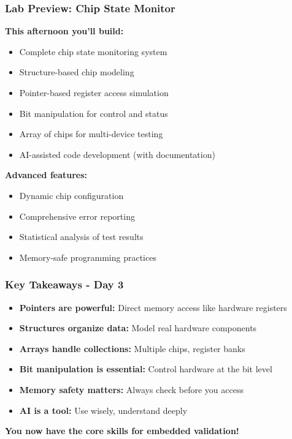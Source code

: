 \documentclass{beamer}
\begin{document}
\begin{frame}
\frametitle{Lab Preview: Chip State Monitor}
\textbf{This afternoon you'll build:}
\begin{itemize}
    \item Complete chip state monitoring system
    \item Structure-based chip modeling
    \item Pointer-based register access simulation
    \item Bit manipulation for control and status
    \item Array of chips for multi-device testing
    \item AI-assisted code development (with documentation)
\end{itemize}

\vspace{0.5cm}
\textbf{Advanced features:}
\begin{itemize}
    \item Dynamic chip configuration
    \item Comprehensive error reporting
    \item Statistical analysis of test results
    \item Memory-safe programming practices
\end{itemize}
\end{frame}

\begin{frame}
\frametitle{Key Takeaways - Day 3}
\begin{itemize}
    \item \textbf{Pointers are powerful:} Direct memory access like hardware registers
    \item \textbf{Structures organize data:} Model real hardware components
    \item \textbf{Arrays handle collections:} Multiple chips, register banks
    \item \textbf{Bit manipulation is essential:} Control hardware at the bit level
    \item \textbf{Memory safety matters:} Always check before you access
    \item \textbf{AI is a tool:} Use wisely, understand deeply
\end{itemize}

\vspace{0.5cm}
\begin{center}
\textbf{You now have the core skills for embedded validation!}
\end{center}
\end{frame}
\end{document}
